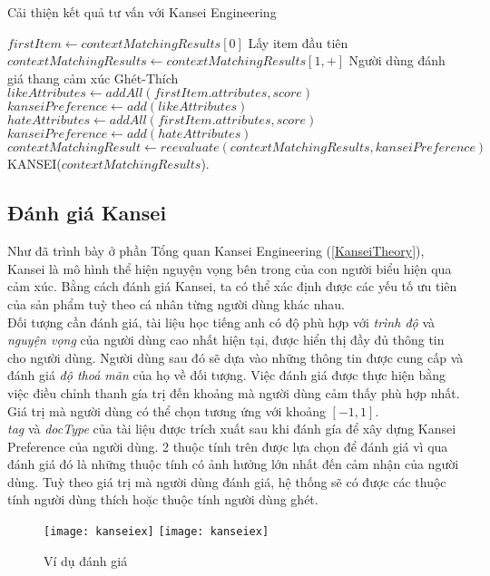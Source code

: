 \begin{algorithm}[H]
\caption{Cải thiện kết quả tư vấn với Kansei Engineering}\label{kansei}
\begin{algorithmic}[1]
\State $firstItem \gets contextMatchingResults[0]$ Lấy item đầu tiên 
\State $contextMatchingResults \gets contextMatchingResults[1,+]$
\State Người dùng đánh giá thang cảm xúc Ghét-Thích
\State $likeAttributes \gets addAll(firstItem.attributes, score)$
\State $kanseiPreference \gets add(likeAttributes)$
\Else
\State $hateAttributes \gets addAll(firstItem.attributes, score)$
\State $kanseiPreference \gets add(hateAttributes)$
\EndIf
\State $contextMatchingResult \gets reevaluate(contextMatchingResults, kanseiPreference)$
\State KANSEI($contextMatchingResults$).
\EndProcedure
\end{algorithmic}
\end{algorithm}


\subsection{Đánh giá Kansei}

Như đã trình bày ở phần Tổng quan Kansei Engineering (\ref{KanseiTheory}), Kansei là mô hình thể hiện nguyện vọng bên trong của con người biểu hiện qua cảm xúc. Bằng cách đánh giá Kansei, ta có thể xác định được các yếu tố ưu tiên của sản phẩm tuỳ theo cá nhân từng người dùng khác nhau.\\

Đối tượng cần đánh giá, tài liệu học tiếng anh có độ phù hợp với \textit{trình độ} và \textit{nguyện vọng} của người dùng cao nhất hiện tại, được hiển thị đầy đủ thông tin cho người dùng. Người dùng sau đó sẽ dựa vào những thông tin được cung cấp và đánh giá \textit{độ thoả mãn} của họ về đối tượng. Việc đánh giá được thực hiện bằng việc điều chỉnh thanh gía trị đến khoảng mà người dùng cảm thấy phù hợp nhất. Giá trị mà người dùng có thể chọn tương ứng với khoảng $[-1, 1 ]$.\\

\textit{tag} và \textit{docType} của tài liệu được trích xuất sau khi đánh gía để xây dựng Kansei Preference của người dùng. 2 thuộc tính trên được lựa chọn để đánh giá vì qua đánh giá đó là những thuộc tính có ảnh hưởng lớn nhất đến cảm nhận của người dùng. Tuỳ theo giá trị mà người dùng đánh giá, hệ thống sẽ có được các thuộc tính người dùng thích hoặc thuộc tính người dùng ghét.

\begin{figure}[H]
  \begin{center}
    \ifpdf
      \texttt{[image: kanseiex]}
    \else
      \texttt{[image: kanseiex]}
    \fi
    \caption{Ví dụ đánh giá}
    \label{KanseiModelEx}
  \end{center}
\end{figure}

